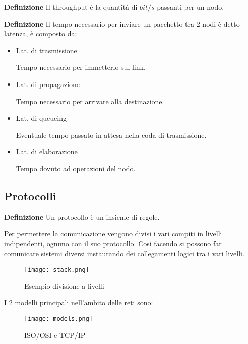 \documentclass{article}
\begin{document}
\noindent\textbf{Definizione} Il throughput è la quantità di $bit/s$ passanti per un nodo.\newline

\noindent\textbf{Definizione} Il tempo necessario per inviare un pacchetto tra 2 nodi è detto latenza, è composto da:
\begin{itemize}
    \item Lat. di trasmissione

        Tempo necessario per immetterlo sul link.

    \item Lat. di propagazione

        Tempo necessario per arrivare alla destinazione.

    \item Lat. di queueing

        Eventuale tempo passato in attesa nella coda di trasmissione.

    \item Lat. di elaborazione

        Tempo dovuto ad operazioni del nodo.\newline
    
\end{itemize}

\subsection{Protocolli}

\textbf{Definizione} Un protocollo è un insieme di regole.\newline

\noindent Per permettere la comunicazione vengono divisi i vari compiti in livelli indipendenti, ognuno con il suo protocollo. Così facendo si possono far comunicare sistemi diversi instaurando dei collegamenti logici tra i vari livelli.\newline

\begin{figure}[ht]
    \centering
    \texttt{[image: stack.png]}
    \caption{Esempio divisione a livelli}
    \label{fig:stack}
\end{figure}

\noindent I 2 modelli principali nell'ambito delle reti sono:

\begin{figure}[ht]
    \centering
    \texttt{[image: models.png]}
    \caption{ISO/OSI e TCP/IP}
    \label{fig:iso_tcp}
\end{figure}
\end{document}
